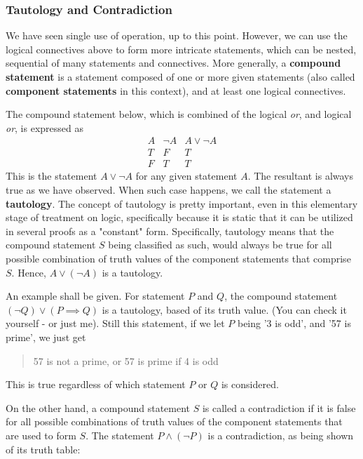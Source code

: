 \subsubsection{Tautology and Contradiction}

We have seen single use of operation, up to this point. However, we can use the logical connectives above to form more intricate statements, which can be nested, sequential of many statements and connectives. More generally, a \textbf{compound statement} is a statement composed of one or more given statements (also called \textbf{component statements} in this context), and at least one logical connectives. 

The compound statement below, which is combined of the logical \textit{or}, and logical \textit{or}, is expressed as
$$\begin{array}{|c|c|c|}
    A & \neg A & A \lor \neg A \\
    T & F & T \\
    F & T & T
\end{array}$$
This is the statement $A \lor \neg A$ for any given statement $A$. The resultant is always true as we have observed. When such case happens, we call the statement a \textbf{tautology}. The concept of  tautology is pretty important, even in this elementary stage of treatment on logic, specifically because it is static that it can be utilized in several proofs as a "constant" form. Specifically, tautology means that the compound statement $S$ being classified as such, would always be true for all possible combination of truth values of the component statements that comprise $S$. Hence, $A \lor (\lnot A)$ is a tautology. 

An example shall be given. For statement $P$ and $Q$, the compound statement $(\lnot Q) \lor (P \implies Q)$ is a tautology, based of its truth value. (You can check it yourself - or just me). Still this statement, if we let $P$ being '3 is odd', and '57 is prime', we just get
\begin{quote}
    57 is not a prime, or 57 is prime if 4 is odd
\end{quote}
This is true regardless of which statement $P$ or $Q$ is considered. 

On the other hand, a compound statement $S$ is called a  contradiction if it is false for all possible combinations of truth values of the component statements that are used to form $S$. The statement $P \land (\lnot P)$ is a contradiction, as being shown of its truth table:

